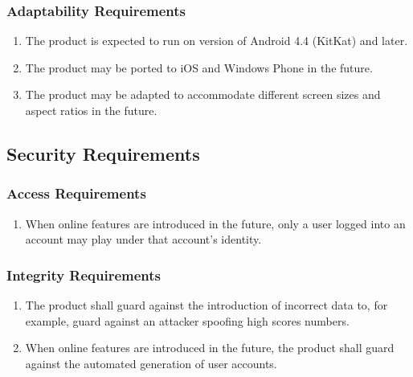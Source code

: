 \documentclass[]{article}
\begin{document}
\subsubsection{Adaptability Requirements}
\label{ssub:adaptability_requirements}
\begin{enumerate}[{MS}1. ]
	\resumeEnum
	\item The product is expected to run on version of Android 4.4 (KitKat) and later.
	\item The product may be ported to iOS and Windows Phone in the future.
	\item The product may be adapted to accommodate different screen sizes and aspect ratios in the future.
\end{enumerate}


\subsection{Security Requirements}
\label{sub:security_requirements}

\subsubsection{Access Requirements}
\label{ssub:access_requirements}
\begin{enumerate}[{SR}1. ]
	\item When online features are introduced in the future, only a user logged into an account may play under that account's identity.
	\holdEnum
\end{enumerate}

\subsubsection{Integrity Requirements}
\label{ssub:integrity_requirements}
\begin{enumerate}[{SR}1. ]
	\resumeEnum
	\item The product shall guard against the introduction of incorrect data to, for example, guard against an attacker spoofing high scores numbers.
	\item When online features are introduced in the future, the product shall guard against the automated generation of user accounts. 
	\holdEnum
\end{enumerate}
\end{document}
